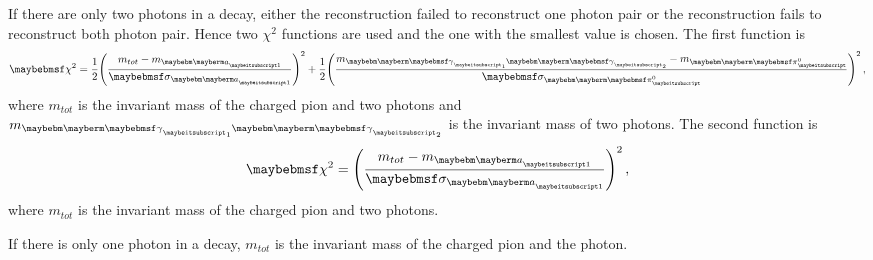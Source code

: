 If there are only two photons in a decay, either the reconstruction failed to reconstruct one photon pair or the reconstruction fails to reconstruct both photon pair. Hence two $\chi^2$ functions are used and the one with the smallest value is chosen. The first function is
\begin{equation}
\chi^{2} =\frac{1}{2} {\left(\frac{m_{tot} -  m_{\Pai}}{\sigma_{\Pai}}\right)}^{2} + \frac{1}{2} {\left(\frac{m_{\Pphoton_1 \Pphoton_2} -  m_{\Ppizero}}{\sigma_{\Ppizero}}\right)}^{2}  \,,
\label{eqn:tauA1TwoPhoton1}
\end{equation}
where $m_{tot}$ is the invariant mass of the charged pion and two photons and $m_{\Pphoton_1 \Pphoton_2}$ is the invariant mass of two photons. The second function is
\begin{equation}
\chi^{2} = {\left(\frac{m_{tot} -  m_{\Pai}}{\sigma_{\Pai}}\right)}^{2} \,,
\label{eqn:tauA1TwoPhoton2}
\end{equation}
where $m_{tot}$ is the invariant mass of the charged pion and two photons.


If there is only one photon in a decay,  $m_{tot}$ is the invariant mass of the charged pion and the photon.

